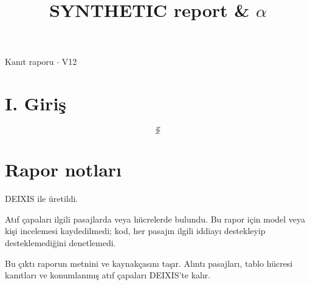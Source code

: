\documentclass[journal]{IEEEtran}
\begin{document}
\renewcommand{\abstractname}{Özet}
\renewcommand{\IEEEkeywordsname}{Dizin Terimleri}
\renewcommand{\refname}{Kaynaklar}

\title{SYNTHETIC report \& \ensuremath{\alpha}}

\maketitle

\noindent Kanıt raporu \ensuremath{\cdot} V12

\section*{I. Giriş}

\begin{equation*}
x\tag{z}
\end{equation*}
\cite{Synth26}
\begin{equation}
\label{eq:EQ1}
x
\end{equation}
\cite{Synth26}

\section*{Rapor notları}

DEIXIS ile üretildi.

Atıf çapaları ilgili pasajlarda veya hücrelerde bulundu. Bu rapor için model veya kişi incelemesi kaydedilmedi; kod, her pasajın ilgili iddiayı destekleyip desteklemediğini denetlemedi.

Bu çıktı raporun metnini ve kaynakçasını taşır. Alıntı pasajları, tablo hücresi kanıtları ve konumlanmış atıf çapaları DEIXIS'te kalır.




\end{document}
